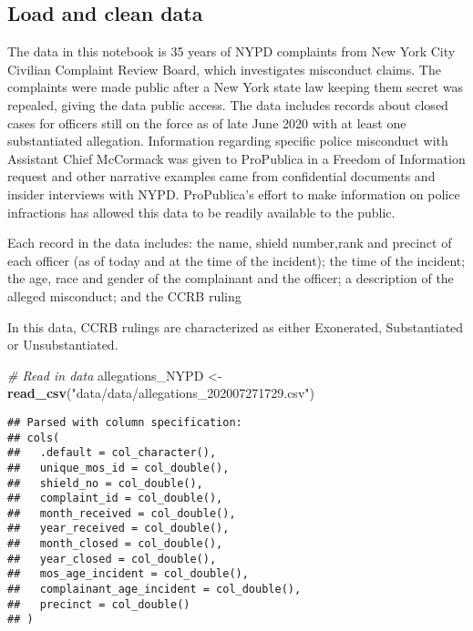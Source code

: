 \documentclass[
]{article}
\newenvironment{Shaded}{\begin{snugshade}}{\end{snugshade}}
\newcommand{\CommentTok}[1]{\textcolor[rgb]{0.56,0.35,0.01}{\textit{#1}}}
\newcommand{\KeywordTok}[1]{\textcolor[rgb]{0.13,0.29,0.53}{\textbf{#1}}}
\newcommand{\NormalTok}[1]{#1}
\newcommand{\StringTok}[1]{\textcolor[rgb]{0.31,0.60,0.02}{#1}}
\begin{document}
\hypertarget{load-and-clean-data}{%
\subsection{Load and clean data}\label{load-and-clean-data}}

The data in this notebook is 35 years of NYPD complaints from New York
City Civilian Complaint Review Board, which investigates misconduct
claims. The complaints were made public after a New York state law
keeping them secret was repealed, giving the data public access. The
data includes records about closed cases for officers still on the force
as of late June 2020 with at least one substantiated allegation.
Information regarding specific police misconduct with Assistant Chief
McCormack was given to ProPublica in a Freedom of Information request
and other narrative examples came from confidential documents and
insider interviews with NYPD. ProPublica's effort to make information on
police infractions has allowed this data to be readily available to the
public.

Each record in the data includes: the name, shield number,rank and
precinct of each officer (as of today and at the time of the incident);
the time of the incident; the age, race and gender of the complainant
and the officer; a description of the alleged misconduct; and the CCRB
ruling

In this data, CCRB rulings are characterized as either Exonerated,
Substantiated or Unsubstantiated.

\begin{Shaded}
\begin{Highlighting}[]
\CommentTok{# Read in data }
\NormalTok{allegations_NYPD <-}\StringTok{ }\KeywordTok{read_csv}\NormalTok{(}\StringTok{"data/data/allegations_202007271729.csv"}\NormalTok{)}
\end{Highlighting}
\end{Shaded}

\begin{verbatim}
## Parsed with column specification:
## cols(
##   .default = col_character(),
##   unique_mos_id = col_double(),
##   shield_no = col_double(),
##   complaint_id = col_double(),
##   month_received = col_double(),
##   year_received = col_double(),
##   month_closed = col_double(),
##   year_closed = col_double(),
##   mos_age_incident = col_double(),
##   complainant_age_incident = col_double(),
##   precinct = col_double()
## )
\end{verbatim}
\end{document}
